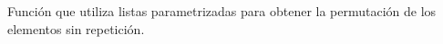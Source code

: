 Función que utiliza listas parametrizadas para obtener la permutación de los elementos sin repetición.
